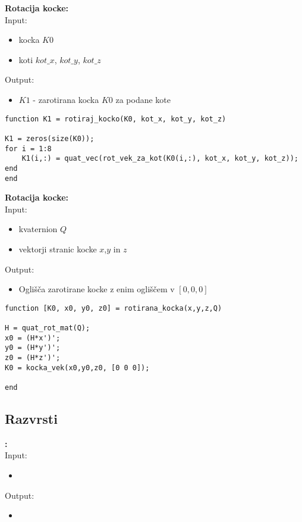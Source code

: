 \documentclass[12pt,a4paper,twoside]{article}
\theoremstyle{definition} %
\theoremstyle{plain} %
\numberwithin{equation}{section}  %
\begin{document}
\vspace{0.5cm}
\textbf{Rotacija kocke:}\\
Input:
\begin{itemize}
\item kocka $K0$
\item koti $kot\_x$, $kot\_y$, $kot\_z$
\end{itemize}
Output:
\begin{itemize}
\item $K1$ - zarotirana kocka $K0$ za podane kote
\end{itemize}

\begin{lstlisting}[caption = {rotiraj\_kocko}]
function K1 = rotiraj_kocko(K0, kot_x, kot_y, kot_z)

K1 = zeros(size(K0));
for i = 1:8
    K1(i,:) = quat_vec(rot_vek_za_kot(K0(i,:), kot_x, kot_y, kot_z));
end
end
\end{lstlisting}

\vspace{0.5cm}
\textbf{Rotacija kocke:}\\
Input:
\begin{itemize}
\item kvaternion $Q$
\item vektorji stranic kocke $x$,$y$ in $z$
\end{itemize}
Output:
\begin{itemize}
\item Oglišča zarotirane kocke z enim ogliščem v $[0,0,0]$
\end{itemize}

\begin{lstlisting}[caption = {rotirana\_kocka}]
function [K0, x0, y0, z0] = rotirana_kocka(x,y,z,Q)

H = quat_rot_mat(Q);
x0 = (H*x')';
y0 = (H*y')'; 
z0 = (H*z')';
K0 = kocka_vek(x0,y0,z0, [0 0 0]);

end
\end{lstlisting}

\newpage

\subsection{Razvrsti}

\textbf{:}\\
Input:
\begin{itemize}
\item 
\end{itemize}
Output:
\begin{itemize}
\item 
\end{itemize}
\end{document}

